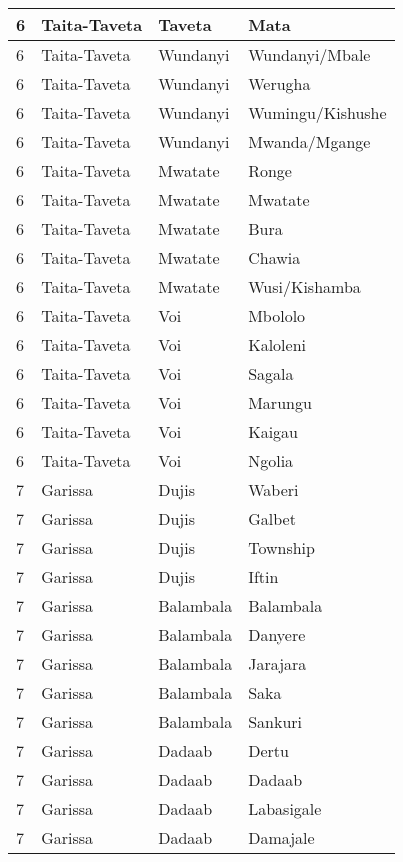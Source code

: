 \begin{table}[!ht]
\begin{tabular}{|l|l|l|l|}
        6 & Taita-Taveta & Taveta & Mata \\ \hline
        6 & Taita-Taveta & Wundanyi & Wundanyi/Mbale \\ \hline
        6 & Taita-Taveta & Wundanyi & Werugha \\ \hline
        6 & Taita-Taveta & Wundanyi & Wumingu/Kishushe \\ \hline
        6 & Taita-Taveta & Wundanyi & Mwanda/Mgange \\ \hline
        6 & Taita-Taveta & Mwatate & Ronge \\ \hline
        6 & Taita-Taveta & Mwatate & Mwatate \\ \hline
        6 & Taita-Taveta & Mwatate & Bura \\ \hline
        6 & Taita-Taveta & Mwatate & Chawia \\ \hline
        6 & Taita-Taveta & Mwatate & Wusi/Kishamba \\ \hline
        6 & Taita-Taveta & Voi & Mbololo \\ \hline
        6 & Taita-Taveta & Voi & Kaloleni \\ \hline
        6 & Taita-Taveta & Voi & Sagala \\ \hline
        6 & Taita-Taveta & Voi & Marungu \\ \hline
        6 & Taita-Taveta & Voi & Kaigau \\ \hline
        6 & Taita-Taveta & Voi & Ngolia \\ \hline
        7 & Garissa & Dujis & Waberi \\ \hline
        7 & Garissa & Dujis & Galbet \\ \hline
        7 & Garissa & Dujis & Township \\ \hline
        7 & Garissa & Dujis & Iftin \\ \hline
        7 & Garissa & Balambala & Balambala \\ \hline
        7 & Garissa & Balambala & Danyere \\ \hline
        7 & Garissa & Balambala & Jarajara \\ \hline
        7 & Garissa & Balambala & Saka \\ \hline
        7 & Garissa & Balambala & Sankuri \\ \hline
        7 & Garissa & Dadaab & Dertu \\ \hline
        7 & Garissa & Dadaab & Dadaab \\ \hline
        7 & Garissa & Dadaab & Labasigale \\ \hline
        7 & Garissa & Dadaab & Damajale \\ \hline

\end{tabular}
\end{table}
